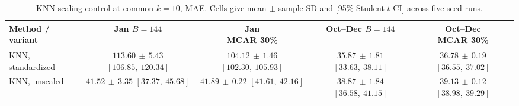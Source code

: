\begin{table}[htbp]
\centering
\caption{{KNN scaling control at common $k=10$, MAE. Cells give mean $\pm$ sample SD and [95\% Student-$t$ CI] across five seed runs.}}
\label{tab:p03_A10}
\begingroup
\footnotesize
\setlength{\tabcolsep}{3pt}
\renewcommand{\arraystretch}{1.15}
\begin{tabular}{lcccc}
\toprule
Method / variant & \makecell{Jan\\$B=144$} & \makecell{Jan\\MCAR 30\%} & \makecell{Oct--Dec\\$B=144$} & \makecell{Oct--Dec\\MCAR 30\%} \\
\midrule
KNN, standardized & \makecell[c]{$113.60\,\pm\,5.43$\\$[106.85,\ 120.34]$} & \makecell[c]{$104.12\,\pm\,1.46$\\$[102.30,\ 105.93]$} & \makecell[c]{$35.87\,\pm\,1.81$\\$[33.63,\ 38.11]$} & \makecell[c]{$36.78\,\pm\,0.19$\\$[36.55,\ 37.02]$} \\
KNN, unscaled & \makecell[c]{$41.52\,\pm\,3.35$\\$[37.37,\ 45.68]$} & \makecell[c]{$41.89\,\pm\,0.22$\\$[41.61,\ 42.16]$} & \makecell[c]{$38.87\,\pm\,1.84$\\$[36.58,\ 41.15]$} & \makecell[c]{$39.13\,\pm\,0.12$\\$[38.98,\ 39.29]$} \\
\bottomrule
\end{tabular}
\endgroup
\end{table}

\clearpage

